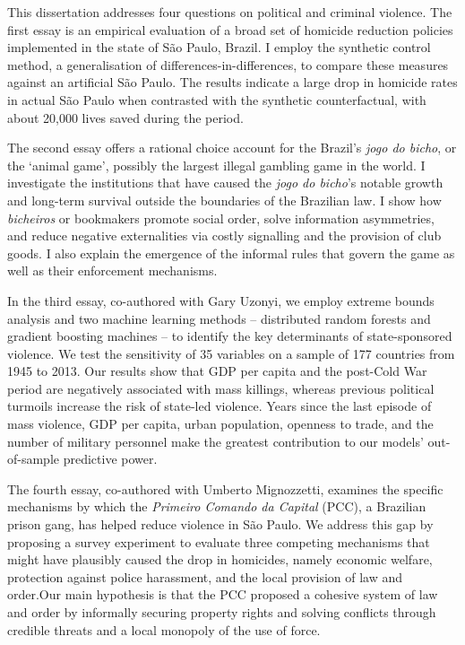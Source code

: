 \documentclass[a4paper,12pt]{report}
\begin{document}
This dissertation addresses four questions on political and criminal violence. The first essay is an empirical evaluation of a broad set of homicide reduction policies implemented in the state of São Paulo, Brazil. I employ the synthetic control method, a generalisation of differences-in-differences, to compare these measures against an artificial São Paulo. The results indicate a large drop in homicide rates in actual São Paulo when contrasted with the synthetic counterfactual, with about 20,000 lives saved during the period. 

The second essay offers a rational choice account for the Brazil's \textit{jogo do bicho}, or the `animal game', possibly the largest illegal gambling game in the world. I investigate the institutions that have caused the \textit{jogo do bicho}'s notable growth and long-term survival outside the boundaries of the Brazilian law. I show how \textit{bicheiros} or bookmakers promote social order, solve information asymmetries, and reduce negative externalities via costly signalling and the provision of club goods. I also explain the emergence of the informal rules that govern the game as well as their enforcement mechanisms. 

In the third essay, co-authored with Gary Uzonyi, we employ extreme bounds analysis and two machine learning methods -- distributed random forests and gradient boosting machines -- to identify the key determinants of state-sponsored violence. We test the sensitivity of 35 variables on a sample of 177 countries from 1945 to 2013. Our results show that GDP per capita and the post-Cold War period are negatively associated with mass killings, whereas previous political turmoils increase the risk of state-led violence. Years since the last episode of mass violence, GDP per capita, urban population, openness to trade, and the number of military personnel make the greatest contribution to our models' out-of-sample predictive power.

The fourth essay, co-authored with Umberto Mignozzetti, examines the specific mechanisms by which the \textit{Primeiro Comando da Capital} (PCC), a Brazilian prison gang,  has helped reduce violence in São Paulo. We address this gap by proposing a survey experiment to evaluate three competing mechanisms that might have plausibly caused the drop in homicides, namely economic welfare, protection against police harassment, and the local provision of law and order.Our main hypothesis is that the PCC proposed a cohesive system of law and order by informally securing property rights and solving conflicts through credible threats and a local monopoly of the use of force.
\end{document}
